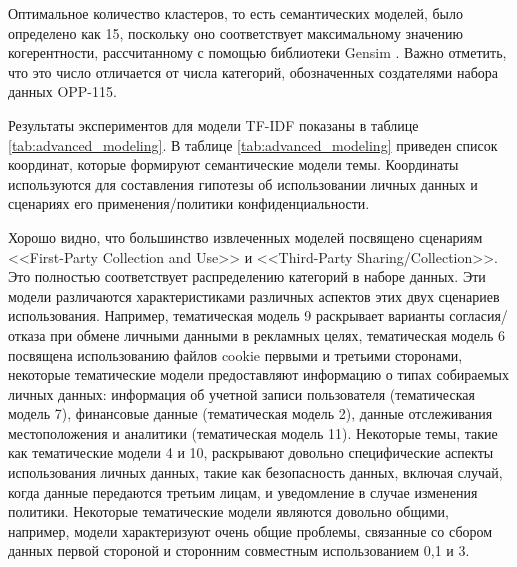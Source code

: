 \documentclass[../main]{subfiles}
\begin{document}
Оптимальное количество кластеров, то есть семантических моделей, было определено как 15, поскольку оно соответствует максимальному значению когерентности, рассчитанному с помощью библиотеки Gensim \cite{MDPI13}. Важно отметить, что это число отличается от числа категорий, обозначенных создателями набора данных OPP-115.

Результаты экспериментов для модели TF-IDF показаны в таблице \ref{tab:advanced_modeling}. В таблице \ref{tab:advanced_modeling} приведен список координат, которые формируют семантические модели темы. Координаты используются для составления гипотезы об использовании личных данных и сценариях его применения/политики конфиденциальности.

Хорошо видно, что большинство извлеченных моделей посвящено сценариям <<First-Party Collection and Use>> и <<Third-Party Sharing/Collection>>. Это полностью соответствует распределению категорий в наборе данных. Эти модели различаются характеристиками различных аспектов этих двух сценариев использования. Например, тематическая модель 9 раскрывает варианты согласия/отказа при обмене личными данными в рекламных целях, тематическая модель 6 посвящена использованию файлов cookie первыми и третьими сторонами, некоторые тематические модели предоставляют информацию о типах собираемых личных данных: информация об учетной записи пользователя (тематическая модель 7), финансовые данные (тематическая модель 2), данные отслеживания местоположения и аналитики (тематическая модель 11). Некоторые темы, такие как тематические модели 4 и 10, раскрывают довольно специфические аспекты использования личных данных, такие как безопасность данных, включая случай, когда данные передаются третьим лицам, и уведомление в случае изменения политики. Некоторые тематические модели являются довольно общими, например, модели характеризуют очень общие проблемы, связанные со сбором данных первой стороной и сторонним совместным использованием 0,1 и 3.
\end{document}
